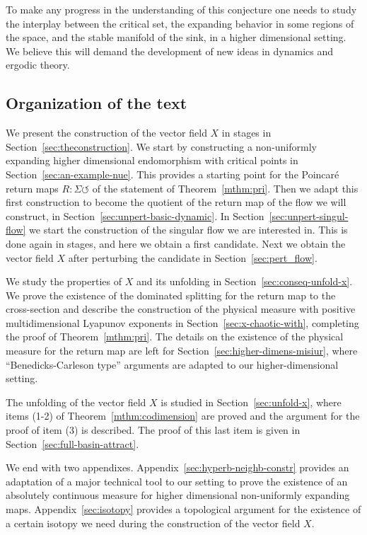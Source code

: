 \documentclass[reqno,12pt,a4paper]{amsart}
\theoremstyle{plain}
\theoremstyle{definition}
\begin{document}
To make any progress in the understanding of this
conjecture one needs to study the interplay between the
critical set, the expanding behavior in some regions of the
space, and the stable manifold of the sink, in a higher
dimensional setting. We believe this will demand the
development of new ideas in dynamics and ergodic theory.

\subsection{Organization of the text}
\label{sec:open-questi}

We present the construction of the vector field $X$ in
stages in Section~\ref{sec:theconstruction}. We start by
constructing a non-uniformly expanding higher dimensional
endomorphism with critical points in
Section~\ref{sec:an-example-nue}. This provides a starting
point for the Poincar\'e return maps
$R:\Sigma\circlearrowleft$ of the statement of
Theorem~\ref{mthm:pri}. Then we adapt this first
construction to become the quotient of the return map of the
flow we will construct, in
Section~\ref{sec:unpert-basic-dynamic}.  In
Section~\ref{sec:unpert-singul-flow} we start the
construction of the singular flow we are interested in. This
is done again in stages, and here we obtain a first
candidate.  Next we obtain the vector field $X$ after
perturbing the candidate in Section~\ref{sec:pert_flow}.

We study the properties of $X$ and its unfolding in
Section~\ref{sec:conseq-unfold-x}. We prove the existence of
the dominated splitting for the return map to the
cross-section and describe the construction of the physical
measure with positive multidimensional Lyapunov exponents in
Section~\ref{sec:x-chaotic-with}, completing the proof of
Theorem~\ref{mthm:pri}. The details on the existence of the
physical measure for the return map are left for
Section~\ref{sec:higher-dimens-misiur}, where
``Benedicks-Carleson type'' arguments are adapted to our
higher-dimensional setting.

The unfolding of the vector field $X$ is studied in
Section~\ref{sec:unfold-x}, where items (1-2) of
Theorem~\ref{mthm:codimension} are proved and the argument for the
proof of item (3) is described. The proof of this
last item is given in Section~\ref{sec:full-basin-attract}.

We end with two
appendixes. Appendix~\ref{sec:hyperb-neighb-constr} provides
an adaptation of a major technical tool to our setting to
prove the existence of an absolutely continuous measure for
higher dimensional non-uniformly expanding maps.
Appendix~\ref{sec:isotopy} provides a topological argument
for the existence of a certain isotopy we need during the
construction of the vector field $X$.
\end{document}
